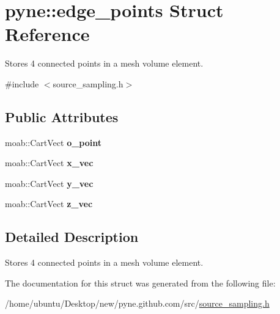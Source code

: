\hypertarget{structpyne_1_1edge__points}{}\section{pyne\+:\+:edge\+\_\+points Struct Reference}
\label{structpyne_1_1edge__points}


Stores 4 connected points in a mesh volume element.  




{\ttfamily \#include $<$source\+\_\+sampling.\+h$>$}

\subsection*{Public Attributes}
\begin{DoxyCompactItemize}
\item 
moab\+::\+Cart\+Vect {\bfseries o\+\_\+point}\hypertarget{structpyne_1_1edge__points_ada309b6576a990d7e911fb31ee450d64}{}\label{structpyne_1_1edge__points_ada309b6576a990d7e911fb31ee450d64}

\item 
moab\+::\+Cart\+Vect {\bfseries x\+\_\+vec}\hypertarget{structpyne_1_1edge__points_ace3786aead7c2cbce033bd48c84df18b}{}\label{structpyne_1_1edge__points_ace3786aead7c2cbce033bd48c84df18b}

\item 
moab\+::\+Cart\+Vect {\bfseries y\+\_\+vec}\hypertarget{structpyne_1_1edge__points_a5a7e7f46555011e67e5b55c0a8af20f1}{}\label{structpyne_1_1edge__points_a5a7e7f46555011e67e5b55c0a8af20f1}

\item 
moab\+::\+Cart\+Vect {\bfseries z\+\_\+vec}\hypertarget{structpyne_1_1edge__points_a63554c3a4e3b789665d686dc9af79f85}{}\label{structpyne_1_1edge__points_a63554c3a4e3b789665d686dc9af79f85}

\end{DoxyCompactItemize}


\subsection{Detailed Description}
Stores 4 connected points in a mesh volume element. 

The documentation for this struct was generated from the following file\+:\begin{DoxyCompactItemize}
\item 
/home/ubuntu/\+Desktop/new/pyne.\+github.\+com/src/\hyperlink{source__sampling_8h}{source\+\_\+sampling.\+h}\end{DoxyCompactItemize}
